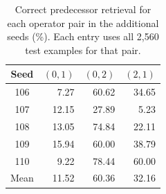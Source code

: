 \begin{table}[H]
\centering\revisioncolor\small
\setlength{\tabcolsep}{5pt}
\caption{Correct predecessor retrieval for each operator pair in the additional seeds (\%). Each entry uses all 2,560 test examples for that pair.}
\label{tab:additional-seeds-pairs}
\begin{tabular}{@{}crrr@{}}
\toprule
Seed & $(0,1)$ & $(0,2)$ & $(2,1)$ \\
\midrule
106 & 7.27 & 60.62 & 34.65 \\
107 & 12.15 & 27.89 & 5.23 \\
108 & 13.05 & 74.84 & 22.11 \\
109 & 15.94 & 60.00 & 38.79 \\
110 & 9.22 & 78.44 & 60.00 \\
\midrule Mean & 11.52 & 60.36 & 32.16 \\
\bottomrule
\end{tabular}
\end{table}
